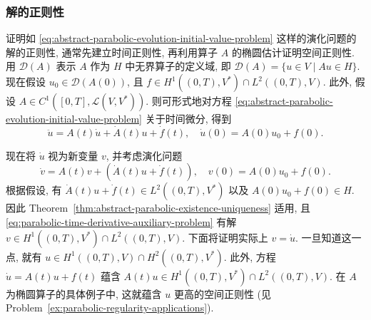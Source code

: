 \subsubsection{解的正则性}\label{subsec:parabolic-solution-regularity}

证明如 \eqref{eq:abstract-parabolic-evolution-initial-value-problem} 这样的演化问题的解的正则性, 通常先建立时间正则性, 再利用算子 $A$ 的椭圆估计证明空间正则性. 用 $\mathcal{D}(A)$ 表示 $A$ 作为 $H$ 中无界算子的定义域, 即 $\mathcal{D}(A)=\{u\in V\mid Au\in H\}$. 现在假设 $u_0\in\mathcal{D}(A(0))$, 且 $f\in H^1((0,T),V^*)\cap L^2((0,T),V)$. 此外, 假设 $A\in C^1([0,T],\mathcal{L}(V,V^*))$. 则可形式地对方程 \eqref{eq:abstract-parabolic-evolution-initial-value-problem} 关于时间微分, 得到
\begin{equation}\label{eq:parabolic-formally-differentiated-evolution-problem}
\ddot u=A(t)\dot u+\dot A(t)u+\dot f(t),\quad\dot u(0)=A(0)u_0+f(0).
\end{equation}


现在将 $\dot u$ 视为新变量 $v$, 并考虑演化问题
\begin{equation}\label{eq:parabolic-time-derivative-auxiliary-problem}
\dot v=A(t)v+(\dot A(t)u+\dot f(t)),\quad v(0)=A(0)u_0+f(0).
\end{equation}
根据假设, 有 $\dot A(t)u+\dot f(t)\in L^2((0,T),V^*)$ 以及 $A(0)u_0+f(0)\in H$. 因此 Theorem~\ref{thm:abstract-parabolic-existence-uniqueness} 适用, 且 \eqref{eq:parabolic-time-derivative-auxiliary-problem} 有解 $v\in H^1((0,T),V^*)\cap L^2((0,T),V)$. 下面将证明实际上 $v=\dot u$. 一旦知道这一点, 就有 $u\in H^1((0,T),V)\cap H^2((0,T),V^*)$. 此外, 方程 $\dot u=A(t)u+f(t)$ 蕴含 $A(t)u\in H^1((0,T),V^*)\cap L^2((0,T),V)$. 在 $A$ 为椭圆算子的具体例子中, 这就蕴含 $u$ 更高的空间正则性 (见 Problem~\ref{ex:parabolic-regularity-applications}).

